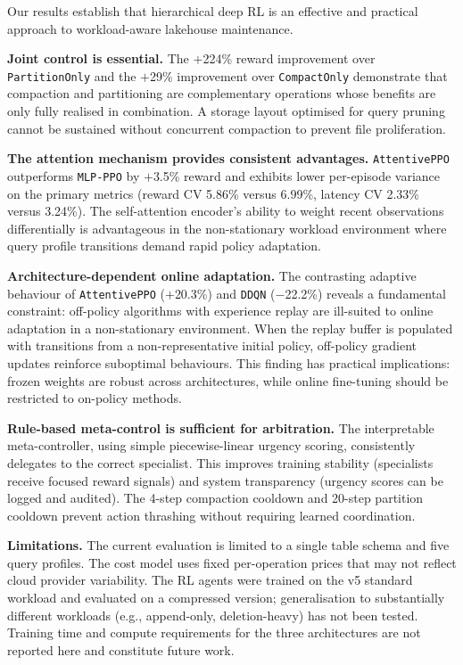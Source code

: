 \documentclass[fleqn,10pt]{wlscirep}
\newcommand{\attentive}{\texttt{AttentivePPO}}
\newcommand{\mlpppo}{\texttt{MLP-PPO}}
\newcommand{\ddqn}{\texttt{DDQN}}
\begin{document}
Our results establish that hierarchical deep RL is an effective and
practical approach to workload-aware lakehouse maintenance.

\textbf{Joint control is essential.}
The $+$224\% reward improvement over \texttt{PartitionOnly} and the
$+$29\% improvement over \texttt{CompactOnly} demonstrate that
compaction and partitioning are complementary operations whose benefits
are only fully realised in combination. A storage layout optimised for
query pruning cannot be sustained without concurrent compaction to
prevent file proliferation.

\textbf{The attention mechanism provides consistent advantages.}
\attentive{} outperforms \mlpppo{} by $+$3.5\% reward and exhibits
lower per-episode variance on the primary metrics (reward CV 5.86\%
versus 6.99\%, latency CV 2.33\% versus 3.24\%). The self-attention encoder's
ability to weight recent observations differentially is advantageous in
the non-stationary workload environment where query profile transitions
demand rapid policy adaptation.

\textbf{Architecture-dependent online adaptation.}
The contrasting adaptive behaviour of \attentive{} ($+$20.3\%) and
\ddqn{} ($-$22.2\%) reveals a fundamental constraint: off-policy
algorithms with experience replay are ill-suited to online adaptation in
a non-stationary environment. When the replay buffer is populated with
transitions from a non-representative initial policy, off-policy gradient
updates reinforce suboptimal behaviours. This finding has practical
implications: frozen weights are robust across architectures, while
online fine-tuning should be restricted to on-policy methods.

\textbf{Rule-based meta-control is sufficient for arbitration.}
The interpretable meta-controller, using simple piecewise-linear urgency
scoring, consistently delegates to the correct specialist. This improves
training stability (specialists receive focused reward signals) and
system transparency (urgency scores can be logged and audited). The
4-step compaction cooldown and 20-step partition cooldown prevent action
thrashing without requiring learned coordination.

\textbf{Limitations.}
The current evaluation is limited to a single table schema and five
query profiles. The cost model uses fixed per-operation prices that may
not reflect cloud provider variability. The RL agents were trained on the
v5 standard workload and evaluated on a compressed version;
generalisation to substantially different workloads (e.g., append-only,
deletion-heavy) has not been tested. Training time and compute
requirements for the three architectures are not reported here and
constitute future work.
\end{document}
